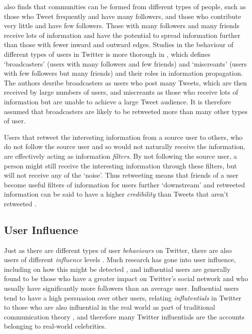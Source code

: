 \cite{java07} also finds that communities can be formed from different types of people, such as those who Tweet frequently and have many followers, and those who contribute very little and have few followers. Those with many followers and many friends receive lots of information and have the potential to spread information further than those with fewer inward and outward edges. Studies in the behaviour of different types of users in Twitter is more thorough in \cite{krishnamurthy08}, which defines `broadcasters' (users with many followers and few friends) and `miscreants' (users with few followers but many friends) and their roles in information propagation. The authors desribe broadcasters as users who post many Tweets, which are then received by large numbers of users, and miscreants as those who receive lots of information but are unable to achieve a large Tweet audience. It is therefore assumed that broadcasters are likely to be retweeted more than many other types of user.

Users that retweet the interesting information from a source user to others, who do not follow the source user and so would not naturally receive the information, are effectively acting as information \textit{filters}. By not following the source user, a person might still receive the interesting information through these filters, but will not receive any of the `noise'. Thus retweeting means that friends of a user become useful filters of information for users further `downstream'  and retweeted information can be said to have a higher \textit{credibility} than Tweets that aren't retweeted \cite{castillo11}.


\subsection{User Influence}
Just as there are different types of user \textit{behaviours} on Twitter, there are also users of different \textit{influence} levels \cite{quercia11}. Much research has gone into user influence, including on how this might be detected \cite{yu11}, and influential users are generally found to be those who have a greater impact on Twitter's social network \cite{bakshy11} and who usually have significantly more followers than an average user. Influential users tend to have a high persuasion over other users, relating \textit{influtentials} in Twitter to those who are also influential in the real world as part of traditional communication theory \cite{cha10}, and therefore many Twitter influentials are the accounts belonging to real-world celebrities.

